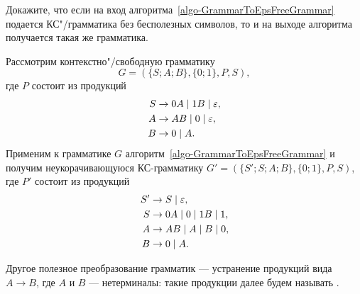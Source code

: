 \begin{myproblem}
\label{problem-GrammarToEpsFreeGrammarWOUselessSymbols}
Докажите, что если на вход алгоритма~\ref{algo-GrammarToEpsFreeGrammar} подается КС"/грамматика без бесполезных символов, то и на выходе алгоритма получается такая же грамматика.
\end{myproblem}

\begin{myexample}
Рассмотрим контекстно"/свободную грамматику
\[
    G=(\{S;A;B\},\{0;1\},P,S),
\]
где $P$ состоит из продукций
\begin{align*}
	S &\to 0A \mid 1B \mid \varepsilon, \\
    A &\to AB \mid 0 \mid \varepsilon, \\
    B &\to 0 \mid A.
\end{align*}
Применим к грамматике $G$ алгоритм~\ref{algo-GrammarToEpsFreeGrammar} и получим неукорачивающуюся КС-грамматику $G'=(\{S';S;A;B\},\{0;1\},P,S)$, где $P'$ состоит из продукций
\begin{align*}
    S' &\to S \mid \varepsilon, \\
    S  &\to 0A \mid 0 \mid 1B \mid 1, \\
    A  &\to AB \mid A \mid B \mid 0, \\
    B  &\to 0 \mid A.
\end{align*}
\end{myexample}

Другое полезное преобразование грамматик --- устранение продукций вида $A\to B$, где $A$ и $B$ --- нетерминалы: такие продукции далее будем называть .

